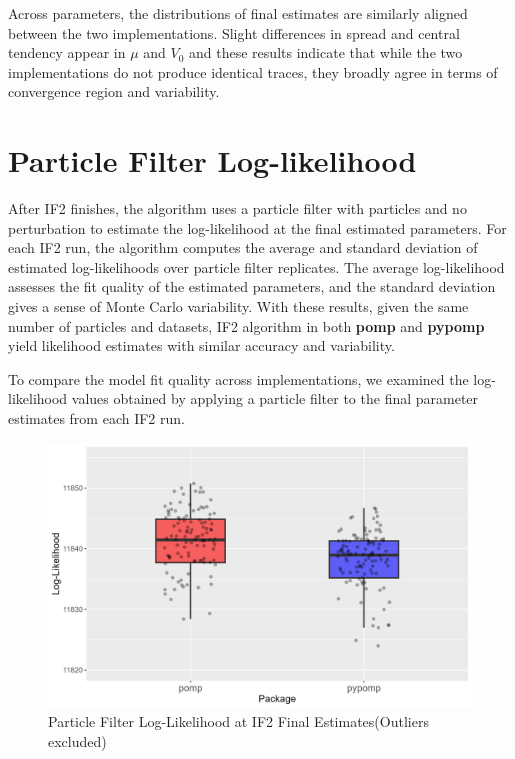 \documentclass[11pt]{report}
\begin{document}
Across parameters, the distributions of final estimates are similarly aligned between the two implementations. Slight differences in spread and central tendency appear in $\mu$ and $V_0$ and these results indicate that while the two implementations do not produce identical traces, they broadly agree in terms of convergence region and variability. 

\section{Particle Filter Log-likelihood}\label{sec:pfilter}
After IF2 finishes, the algorithm uses a particle filter with particles and no perturbation to estimate the log-likelihood at the final estimated parameters. For each IF2 run, the algorithm computes the average and standard deviation of estimated log-likelihoods over particle filter replicates. The average log-likelihood assesses the fit quality of the estimated parameters, and the standard deviation gives a sense of Monte Carlo variability.
With these results, given the same number of particles and datasets, IF2 algorithm in both \textbf{pomp} and \textbf{pypomp} yield likelihood estimates with similar accuracy and variability.

To compare the model fit quality across implementations, we examined the log-likelihood values obtained by applying a particle filter to the final parameter estimates from each IF2 run. 
\begin{figure}[ht] 
\begin{center}
\includegraphics[width=\textwidth]{pfilter_ll_box_plot.png}
\end{center}
\caption{Particle Filter Log-Likelihood at IF2 Final Estimates(Outliers excluded)}
\label{fig:pfilterplot}
\end{figure}
\end{document}
